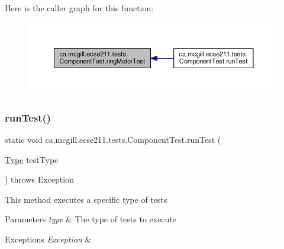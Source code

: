 Here is the caller graph for this function\+:\nopagebreak
\begin{figure}[H]
\begin{center}
\leavevmode
\includegraphics[width=350pt]{enumca_1_1mcgill_1_1ecse211_1_1tests_1_1_component_test_a1ecca45b47067d825683cf46dcf22b62_icgraph}
\end{center}
\end{figure}
\mbox{\label{enumca_1_1mcgill_1_1ecse211_1_1tests_1_1_component_test_a5dc8bf97bc48adf5bee88d425a1a974e}} 
\subsubsection{\texorpdfstring{run\+Test()}{runTest()}}
{\footnotesize\ttfamily static void ca.\+mcgill.\+ecse211.\+tests.\+Component\+Test.\+run\+Test (\begin{DoxyParamCaption}\item[{\hyperlink{enumca_1_1mcgill_1_1ecse211_1_1tests_1_1_component_test_1_1_type}{Type}}]{test\+Type }\end{DoxyParamCaption}) throws Exception\hspace{0.3cm}{\ttfamily [static]}}

This method executes a specific type of tests


\begin{DoxyParams}{Parameters}
{\em type} & The type of tests to execute \\
\hline
\end{DoxyParams}

\begin{DoxyExceptions}{Exceptions}
{\em Exception} & \\
\hline
\end{DoxyExceptions}


